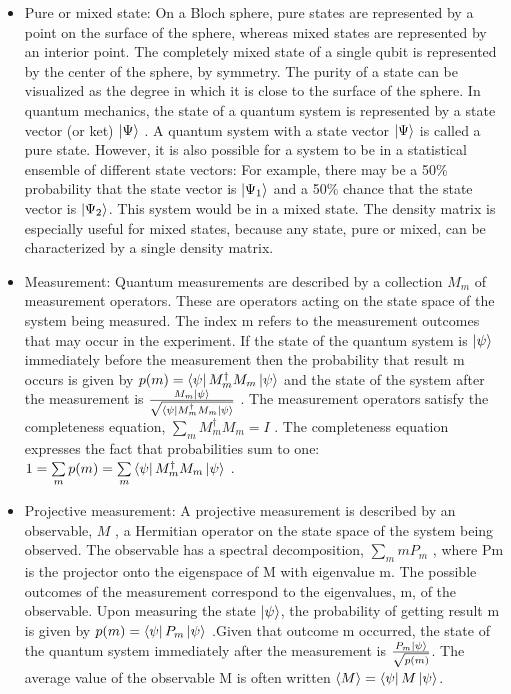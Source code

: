 \documentclass{article}
\begin{document}
\begin{itemize}
        \item Pure or mixed state:  On a Bloch sphere, pure states are represented by a point on the surface of the sphere, whereas mixed states are represented by an interior point. The completely mixed state of a single qubit is represented by the center of the sphere, by symmetry. The purity of a state can be visualized as the degree in which it is close to the surface of the sphere. In quantum mechanics, the state of a quantum system is represented by a state vector (or ket) $\ket{\Psi}$ . A quantum system with a state vector $\ket{\Psi}$ is called a pure state. However, it is also possible for a system to be in a statistical ensemble of different state vectors: For example, there may be a 50\% probability that the state vector is $\ket{\Psi_{1}}$ and a 50\% chance that the state vector is $\ket{\Psi_{2}}$. This system would be in a mixed state. The density matrix is especially useful for mixed states, because any state, pure or mixed, can be characterized by a single density matrix. 
        
        \item Measurement: Quantum measurements are described by a collection ${M_m}$ of measurement operators. These are operators acting on the state space of the  system being measured. The index m refers to the measurement outcomes that may occur in the experiment. If the state of the quantum system is $\ket{\psi}$ immediately before the measurement then the probability that result m occurs is given by $p(m) = \bra{\psi}M_{m}^{\dag}M_{m}\ket{\psi}$ and the state of the system after the measurement is $\frac{M_{m}\ket{\psi}}{\sqrt{\bra{\psi}M_{m}^{\dag}M_{m}\ket{\psi}}}$ . The measurement operators satisfy the completeness equation, $\sum\limits_{m} M_{m}^{\dag}M_{m} = I$ . The completeness equation expresses the fact that probabilities sum to one: $1 = \sum\limits_{m} p(m) = \sum\limits_{m} \bra{\psi}M_{m}^{\dag}M_{m}\ket{\psi}$ . \cite{quantccompquantinfo}
        
        \item Projective measurement: A projective measurement is described by an observable, $M$ , a Hermitian operator on the state space of the system being observed. The observable has a spectral decomposition, $\sum\limits_m mP_m$ , where Pm is the projector onto the eigenspace of M with eigenvalue m. The possible outcomes of the measurement correspond to the eigenvalues, m, of the observable. Upon measuring the state $\ket{\psi}$, the probability of getting result m is given by $p(m) = \bra{\psi}P_m\ket{\psi}$ .Given that outcome m occurred, the state of the quantum system immediately after the measurement is $\frac{P_m\ket{\psi}}{\sqrt{p(m)}}$. The average value of the observable M is often written $\braket{M} = \bra{\psi}M\ket{\psi}$.\cite{quantccompquantinfo}
        

\end{itemize}
\end{document}
